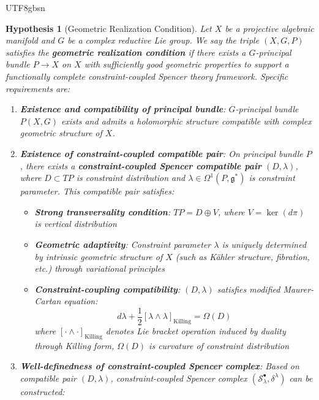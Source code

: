 \documentclass[a4paper,12pt]{extarticle}
\newtheorem{hypothesis}[theorem]{Hypothesis}
\theoremstyle{definition}
\begin{document}
\begin{CJK}{UTF8}{gbsn}
\begin{hypothesis}[Geometric Realization Condition]
\label{hyp:geometric_realization}
Let $X$ be a projective algebraic manifold and $G$ be a complex reductive Lie group. We say the triple $(X, G, P)$ satisfies the \textbf{geometric realization condition} if there exists a $G$-principal bundle $P \to X$ on $X$ with sufficiently good geometric properties to support a functionally complete constraint-coupled Spencer theory framework. Specific requirements are:
\begin{enumerate}
    \item \textbf{Existence and compatibility of principal bundle}: $G$-principal bundle $P(X,G)$ exists and admits a holomorphic structure compatible with complex geometric structure of $X$.
    \item \textbf{Existence of constraint-coupled compatible pair}: On principal bundle $P$, there exists a \textbf{constraint-coupled Spencer compatible pair} $(D, \lambda)$, where $D \subset TP$ is constraint distribution and $\lambda \in \Omega^1(P, \mathfrak{g}^*)$ is constraint parameter. This compatible pair satisfies:
    \begin{itemize}
        \item \textbf{Strong transversality condition}: $TP = D \oplus V$, where $V = \ker(d\pi)$ is vertical distribution
        \item \textbf{Geometric adaptivity}: Constraint parameter $\lambda$ is uniquely determined by intrinsic geometric structure of $X$ (such as Kähler structure, fibration, etc.) through variational principles
        \item \textbf{Constraint-coupling compatibility}: $(D, \lambda)$ satisfies modified Maurer-Cartan equation:
        \begin{equation}
        \label{eq:modified_maurer_cartan}
        d\lambda + \frac{1}{2}[\lambda \wedge \lambda]_{\text{Killing}} = \Omega(D)
        \end{equation}
        where $[\cdot \wedge \cdot]_{\text{Killing}}$ denotes Lie bracket operation induced by duality through Killing form, $\Omega(D)$ is curvature of constraint distribution
    \end{itemize}
    \item \textbf{Well-definedness of constraint-coupled Spencer complex}: Based on compatible pair $(D, \lambda)$, constraint-coupled Spencer complex $(\mathcal{S}^{\bullet}_\lambda, \delta^\lambda)$ can be constructed:
    \begin{align}

\end{align}
\end{enumerate}
\end{hypothesis}
\end{CJK}
\end{document}
